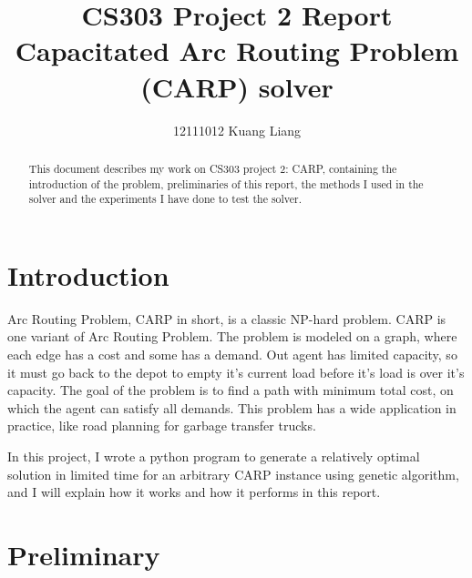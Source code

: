 \documentclass[lettersize,journal]{IEEEtran}
\begin{document}
\title{{\huge CS303 Project 2 Report\\}{
Capacitated Arc Routing Problem (CARP) solver}}

\author{12111012 Kuang Liang}

\maketitle

\begin{abstract}
This document describes my work on CS303 project 2: CARP, containing the introduction of the problem, preliminaries of this report, the methods I used in the solver and the experiments I have done to test the solver. 
\end{abstract}

\section{Introduction}

 Arc Routing Problem, CARP in short, is a classic NP-hard problem. CARP is one variant of Arc Routing Problem. The problem is modeled on a graph, where each edge has a cost and some has a demand. Out agent has limited capacity, so it must go back to the depot to empty it’s current load before it’s load is over it's capacity. The goal of the problem is to find a path with minimum total cost, on which the agent can satisfy all demands\cite{ref1}. This problem has a wide application in practice, like road planning for garbage transfer trucks.

In this project, I wrote a python program to generate a relatively optimal solution in limited time for an arbitrary CARP instance using genetic algorithm, and I will explain how it works and how it performs in this report.

\section{Preliminary}
\end{document}
